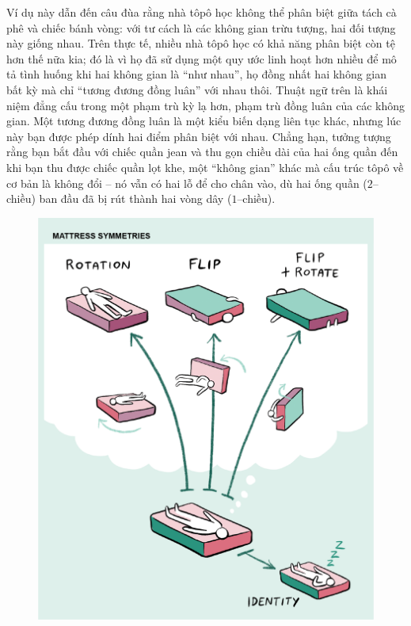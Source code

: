 \begin{multicols}{2}
	\vskip 0.1cm
	Ví dụ này dẫn đến câu đùa rằng nhà tôpô học không thể phân biệt giữa tách cà phê và chiếc bánh vòng: với tư cách là các không gian trừu tượng, hai đối tượng này giống nhau. Trên thực tế, nhiều nhà tôpô học có khả năng phân biệt còn tệ hơn thế nữa kia; đó là vì họ đã sử dụng một quy ước linh hoạt hơn nhiều để mô tả tình huống khi hai không gian là ``như nhau'', họ đồng nhất hai không gian bất kỳ mà chỉ ``tương đương đồng luân'' với nhau thôi. Thuật ngữ trên là khái niệm đẳng cấu trong một phạm trù kỳ lạ hơn, phạm trù đồng luân của các không gian. Một tương đương đồng luân là một kiểu biến dạng liên tục khác, nhưng lúc này bạn được phép dính hai điểm phân biệt với nhau. Chẳng hạn, tưởng tượng rằng bạn bắt đầu với chiếc quần jean và thu gọn chiều dài của hai ống quần đến khi bạn thu được chiếc quần lọt khe, một ``không gian'' khác mà cấu trúc tôpô về cơ bản là không đổi -- nó vẫn có hai lỗ để cho chân vào, dù hai ống quần ($2$--chiều) ban đầu đã bị rút thành hai vòng dây ($1$--chiều).
	\begin{figure}[H]
		\centering
		\vspace*{-5pt}
		\captionsetup{labelformat= empty, justification=centering}
		\includegraphics[width=1\linewidth]{6}

\end{figure}
\end{multicols}
